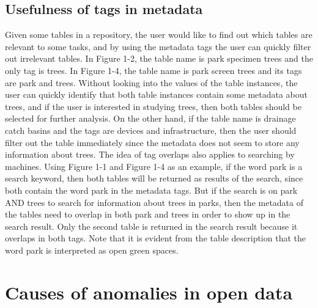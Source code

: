 \subsection{Usefulness of tags in metadata}
Given some tables in a repository, the user would like to find out which tables are relevant to some tasks, and by using the metadata tags the user can quickly filter out irrelevant tables. In Figure 1-2, the table name is park specimen trees and the only tag is trees. In Figure 1-4, the table name is park screen trees and its tags are park and trees. Without looking into the values of the table instances, the user can quickly identify that both table instances contain some metadata about trees, and if the user is interested in studying trees, then both tables should be selected for further analysis. On the other hand, if the table name is drainage catch basins and the tags are devices and infrastructure, then the user should filter out the table immediately since the metadata does not seem to store any information about trees.
The idea of tag overlaps also applies to searching by machines. Using Figure 1-1 and Figure 1-4 as an example, if the word park is a search keyword, then both tables will be returned as results of the search, since both contain the word park in the metadata tags. But if the search is on park AND trees to search for information about trees in parks, then the metadata of the tables need to overlap in both park and trees in order to show up in the search result. Only the second table is returned in the search result because it overlaps in both tags. Note that it is evident from the table description that the word park is interpreted as open green spaces.

\section{Causes of anomalies in open data}
\label{sec:CausesOfAnomaliesInOpenData}

